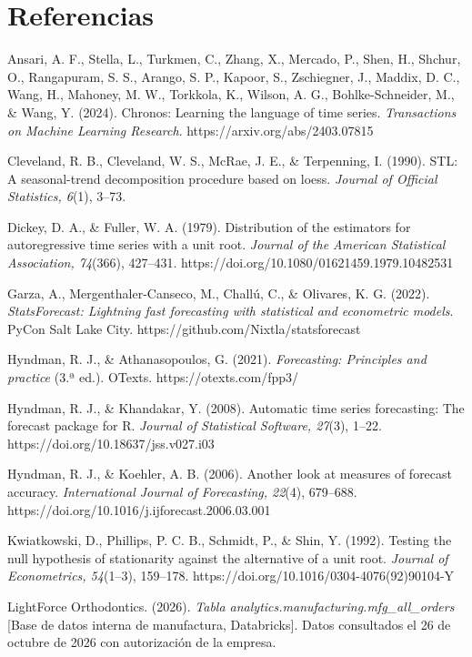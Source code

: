 \documentclass[
  spanish,
  11pt,
]{article}
\begin{document}
\section{Referencias}\label{referencias}

Ansari, A. F., Stella, L., Turkmen, C., Zhang, X., Mercado, P., Shen,
H., Shchur, O., Rangapuram, S. S., Arango, S. P., Kapoor, S.,
Zschiegner, J., Maddix, D. C., Wang, H., Mahoney, M. W., Torkkola, K.,
Wilson, A. G., Bohlke-Schneider, M., \& Wang, Y. (2024). Chronos:
Learning the language of time series. \emph{Transactions on Machine
Learning Research}. https://arxiv.org/abs/2403.07815

Cleveland, R. B., Cleveland, W. S., McRae, J. E., \& Terpenning, I.
(1990). STL: A seasonal-trend decomposition procedure based on loess.
\emph{Journal of Official Statistics, 6}(1), 3–73.

Dickey, D. A., \& Fuller, W. A. (1979). Distribution of the estimators
for autoregressive time series with a unit root. \emph{Journal of the
American Statistical Association, 74}(366), 427–431.
https://doi.org/10.1080/01621459.1979.10482531

Garza, A., Mergenthaler-Canseco, M., Challú, C., \& Olivares, K. G.
(2022). \emph{StatsForecast: Lightning fast forecasting with statistical
and econometric models}. PyCon Salt Lake City.
https://github.com/Nixtla/statsforecast

Hyndman, R. J., \& Athanasopoulos, G. (2021). \emph{Forecasting:
Principles and practice} (3.ª ed.). OTexts. https://otexts.com/fpp3/

Hyndman, R. J., \& Khandakar, Y. (2008). Automatic time series
forecasting: The forecast package for R. \emph{Journal of Statistical
Software, 27}(3), 1–22. https://doi.org/10.18637/jss.v027.i03

Hyndman, R. J., \& Koehler, A. B. (2006). Another look at measures of
forecast accuracy. \emph{International Journal of Forecasting, 22}(4),
679–688. https://doi.org/10.1016/j.ijforecast.2006.03.001

Kwiatkowski, D., Phillips, P. C. B., Schmidt, P., \& Shin, Y. (1992).
Testing the null hypothesis of stationarity against the alternative of a
unit root. \emph{Journal of Econometrics, 54}(1–3), 159–178.
https://doi.org/10.1016/0304-4076(92)90104-Y

LightForce Orthodontics. (2026). \emph{Tabla
analytics.manufacturing.mfg\_all\_orders} {[}Base de datos interna de
manufactura, Databricks{]}. Datos consultados el 26 de octubre de 2026
con autorización de la empresa.
\end{document}
